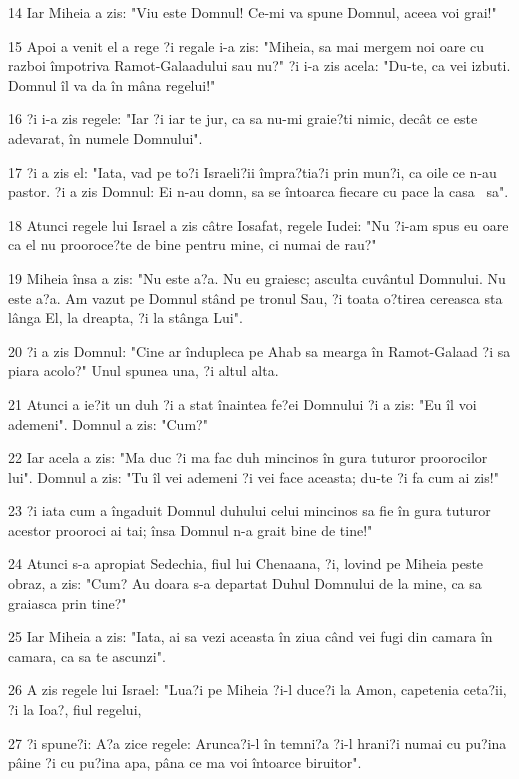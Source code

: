 \par 14 Iar Miheia a zis: "Viu este Domnul! Ce-mi va spune Domnul, aceea voi grai!"
\par 15 Apoi a venit el a rege ?i regale i-a zis: "Miheia, sa mai mergem noi oare cu razboi împotriva Ramot-Galaadului sau nu?" ?i i-a zis acela: "Du-te, ca vei izbuti. Domnul îl va da în mâna regelui!"
\par 16 ?i i-a zis regele: "Iar ?i iar te jur, ca sa nu-mi graie?ti nimic, decât ce este adevarat, în numele Domnului".
\par 17 ?i a zis el: "Iata, vad pe to?i Israeli?ii împra?tia?i prin mun?i, ca oile ce n-au pastor. ?i a zis Domnul: Ei n-au domn, sa se întoarca fiecare cu pace la casa  sa".
\par 18 Atunci regele lui Israel a zis câtre Iosafat, regele Iudei: "Nu ?i-am spus eu oare ca el nu prooroce?te de bine pentru mine, ci numai de rau?"
\par 19 Miheia însa a zis: "Nu este a?a. Nu eu graiesc; asculta cuvântul Domnului. Nu este a?a. Am vazut pe Domnul stând pe tronul Sau, ?i toata o?tirea cereasca sta lânga El, la dreapta, ?i la stânga Lui".
\par 20 ?i a zis Domnul: "Cine ar îndupleca pe Ahab sa mearga în Ramot-Galaad ?i sa piara acolo?" Unul spunea una, ?i altul alta.
\par 21 Atunci a ie?it un duh ?i a stat înaintea fe?ei Domnului ?i a zis: "Eu îl voi ademeni". Domnul a zis: "Cum?"
\par 22 Iar acela a zis: "Ma duc ?i ma fac duh mincinos în gura tuturor proorocilor lui". Domnul a zis: "Tu îl vei ademeni ?i vei face aceasta; du-te ?i fa cum ai zis!"
\par 23 ?i iata cum a îngaduit Domnul duhului celui mincinos sa fie în gura tuturor acestor prooroci ai tai; însa Domnul n-a grait bine de tine!"
\par 24 Atunci s-a apropiat Sedechia, fiul lui Chenaana, ?i, lovind pe Miheia peste obraz, a zis: "Cum? Au doara s-a departat Duhul Domnului de la mine, ca sa graiasca prin tine?"
\par 25 Iar Miheia a zis: "Iata, ai sa vezi aceasta în ziua când vei fugi din camara în camara, ca sa te ascunzi".
\par 26 A zis regele lui Israel: "Lua?i pe Miheia ?i-l duce?i la Amon, capetenia ceta?ii, ?i la Ioa?, fiul regelui,
\par 27 ?i spune?i: A?a zice regele: Arunca?i-l în temni?a ?i-l hrani?i numai cu pu?ina pâine ?i cu pu?ina apa, pâna ce ma voi întoarce biruitor".

